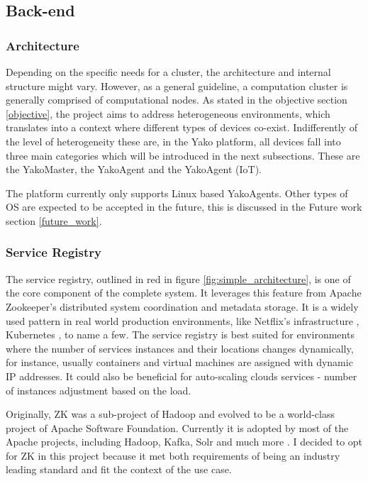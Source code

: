 \subsection{Back-end} \label{section:backend}
    \subsubsection{Architecture}
        Depending on the specific needs for a cluster, the architecture and internal structure might vary. However, as a general guideline, a computation cluster is generally comprised of computational nodes. As stated in the objective section \ref{objective}, the project aims to address heterogeneous environments, which translates into a context where different types of devices co-exist. Indifferently of the level of heterogeneity these are, in the Yako platform, all devices fall into three main categories which will be introduced in the next subsections. These are the YakoMaster, the YakoAgent and the YakoAgent (IoT).
        
        The platform currently only supports Linux based YakoAgents. Other types of OS are expected to be accepted in the future, this is discussed in the Future work section \ref{future_work}. 
        
    \subsubsection{Service Registry}
        The service registry, outlined in red in figure \ref{fig:simple_architecture}, is one of the core component of the complete system. It leverages this feature from Apache Zookeeper's distributed system coordination and metadata storage. It is a widely used pattern in real world production environments, like Netflix's infrastructure \cite{netflix_technology_blog_netflix_2017}, Kubernetes \cite{cloud_native_computing_foundation_operating_nodate}, to name a few.
        The service registry is best suited for environments where the number of services instances and their locations changes dynamically, for instance, usually containers and virtual machines are assigned with dynamic IP addresses. It could also be beneficial for auto-scaling clouds services - number of instances adjustment based on the load.
        
        Originally, ZK was a sub-project of Hadoop and evolved to be a world-class project of Apache Software Foundation. Currently it is adopted by most of the Apache projects, including Hadoop, Kafka, Solr and much more \cite{reed_poweredby_2019}. I decided to opt for ZK in this project because it met both requirements of being an industry leading standard and fit the context of the use case.
        
